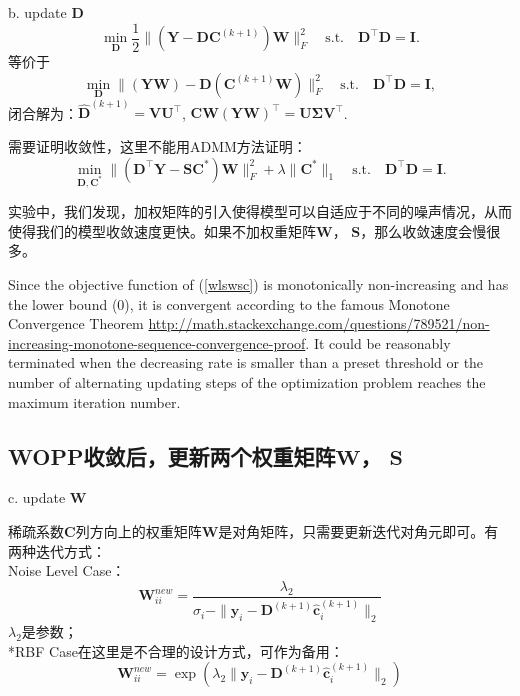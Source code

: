 \documentclass[10pt,twocolumn,letterpaper]{article}
\begin{document}
b. update $\mathbf{D}$
\begin{equation}
\min_{\mathbf{D}}\frac{1}{2}\|(\mathbf{Y}-\mathbf{D}\mathbf{C}^{(k+1)})\mathbf{W}\|_{F}^{2}
\quad
\text{s.t.}
\quad
\mathbf{D}^{\top}\mathbf{D} =\mathbf{I}. 
\end{equation}
等价于
\begin{equation}
\min_{\mathbf{D}}\|(\mathbf{Y}\mathbf{W})-\mathbf{D}(\mathbf{C}^{(k+1)}\mathbf{W})\|_{F}^{2}
\quad
\text{s.t.}
\quad
\mathbf{D}^{\top}\mathbf{D} = \mathbf{I},
\end{equation}
闭合解为：$\hat{\mathbf{D}}^{(k+1)}=\mathbf{V}\mathbf{U}^{\top}$, $\mathbf{C}\mathbf{W}(\mathbf{Y}\mathbf{W})^{\top}=\mathbf{U}\mathbf{\Sigma}\mathbf{V}^{\top}$.

需要证明收敛性，这里不能用ADMM方法证明：
\begin{equation}
\min_{\mathbf{D},\mathbf{C}^{*}}\|(\mathbf{D}^{\top}\mathbf{Y}-\mathbf{S}\mathbf{C}^{*})\mathbf{W}\|_{F}^{2} 
+
\lambda\|\mathbf{C}^{*}\|_{1}
\quad
\text{s.t.}
\quad
\mathbf{D}^{\top}\mathbf{D} = \mathbf{I}.
\end{equation}


实验中，我们发现，加权矩阵的引入使得模型可以自适应于不同的噪声情况，从而使得我们的模型收敛速度更快。如果不加权重矩阵$\mathbf{W}$， $\mathbf{S}$，那么收敛速度会慢很多。

Since the objective function of (\ref{wlswsc}) is monotonically non-increasing and has the lower bound (0), it is convergent according to the famous Monotone Convergence Theorem \cite{stein2009real} \url{http://math.stackexchange.com/questions/789521/non-increasing-monotone-sequence-convergence-proof}. It could be reasonably terminated when the decreasing rate is smaller than a preset threshold or the number of alternating updating steps of the optimization problem reaches the maximum iteration number. 

\subsection{WOPP收敛后，更新两个权重矩阵$\mathbf{W}$， $\mathbf{S}$}
c. update $\mathbf{W}$

稀疏系数$\mathbf{C}$列方向上的权重矩阵$\mathbf{W}$是对角矩阵，只需要更新迭代对角元即可。有两种迭代方式：
\\
Noise Level Case：
\begin{equation}
\mathbf{W}_{ii}^{new}=\frac{\lambda_{2}}{\sigma_{i}-\|\mathbf{y}_{i}-\mathbf{D}^{(k+1)}\hat{\mathbf{c}}_{i}^{(k+1)}\|_{2}}
\end{equation}
$\lambda_{2}$是参数；
\\
*RBF Case在这里是不合理的设计方式，可作为备用：
\begin{equation}
\mathbf{W}_{ii}^{new}=\exp(\lambda_{2}\|\mathbf{y}_{i}-\mathbf{D}^{(k+1)}\hat{\mathbf{c}}_{i}^{(k+1)}\|_{2})
\end{equation}
\end{document}
